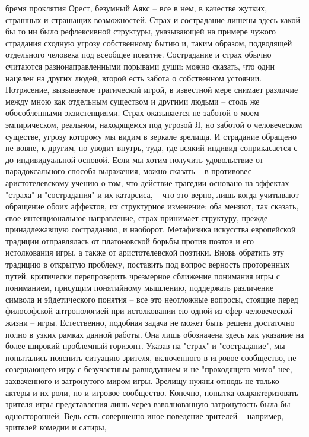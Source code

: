 \documentclass[12pt]{article}
\begin{document}
бремя проклятия Орест, безумный Аякс -- все в нем, в качестве жутких, страшных и страшащих возможностей.
Страх и сострадание лишены здесь какой бы то ни было рефлексивной структуры, указывающей на примере
чужого страдания сходную угрозу собственному бытию и, таким образом, подводящей отдельного человека под
всеобщее понятие. Сострадание и страх обычно считаются
разнонаправленными порывами души: можно сказать, что один нацелен на других людей, второй есть забота о
собственном устоянии. Потрясение, вызываемое трагической игрой, в известной мере снимает различие между
мною  как  отдельным  существом  и  другими  людьми  --  столь  же  обособленными  экзистенциями.  Страх
оказывается  не  заботой  о  моем  эмпирическом,  реальном,  находящемся  под  угрозой  Я,  но  заботой  о
человеческом существе, угрозу которому мы видим в зеркале зрелища. И страдание обращено не вовне, к
другим, но уводит внутрь, туда, где всякий индивид соприкасается с до-индивидуальной основой. Если мы
хотим  получить  удовольствие  от  парадоксального  способа  выражения,  можно  сказать  --  в  противовес
аристотелевскому учению о том, что действие трагедии основано на эффектах "страха" и "сострадания" и их
катарсиса, -- что это верно, лишь когда учитывают обращение обоих аффектов, их структурное изменение: оба
меняют, так сказать, свое интенциональное направление, страх принимает структуру, прежде принадлежавшую
состраданию, и наоборот. Метафизика искусства европейской традиции отправлялась от платоновской борьбы 
против поэтов и его истолкования игры, а также от аристотелевской поэтики. Вновь обратить эту традицию в
открытую проблему, поставить под вопрос верность проторенных путей, критически перепроверить чрезмерное
сближение  понимания  игры  с  пониманием,  присущим  понятийному  мышлению,  поддержать  различение
символа и эйдетического понятия -- все это неотложные вопросы, стоящие перед философской антропологией
при истолковании ею одной из сфер человеческой жизни -- игры. Естественно, подобная задача не может быть
решена достаточно полно в узких рамках данной работы. Она лишь обозначена здесь как указание на более
широкий проблемный горизонт.
Указав  на  "страх"  и  "сострадание",  мы  попытались  пояснить  ситуацию  зрителя,  включенного  в  игровое
сообщество, не созерцающего игру с безучастным равнодушием и не "проходящего мимо" нее, захваченного и
затронутого миром игры. Зрелищу нужны отнюдь не только актеры и их роли, но и игровое сообщество.
Конечно, попытка охарактеризовать зрителя игры-представления лишь через взволнованную затронутость была
бы односторонней. Ведь есть совершенно иное поведение зрителей -- например, зрителей комедии и сатиры,
\end{document}
